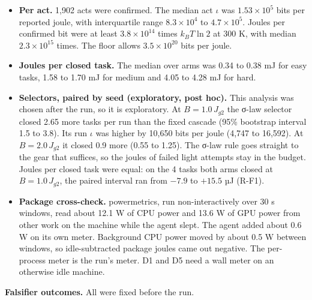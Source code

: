 \documentclass[
  10pt,
]{article}
\providecommand{\tightlist}{%
  \setlength{\itemsep}{0pt}\setlength{\parskip}{0pt}}
\begin{document}
\begin{itemize}
\tightlist
\item
  \textbf{Per act.} 1,902 acts were confirmed. The median act \(\iota\)
  was \(1.53 \times 10^5\) bits per reported joule, with interquartile
  range \(8.3 \times 10^4\) to \(4.7 \times 10^5\). Joules per confirmed
  bit were at least \(3.8 \times 10^{14}\) times \(k_B T\ln 2\) at 300
  K, with median \(2.3 \times 10^{15}\) times. The floor allows
  \(3.5 \times 10^{20}\) bits per joule.
\item
  \textbf{Joules per closed task.} The median over arms was 0.34 to 0.38
  mJ for easy tasks, 1.58 to 1.70 mJ for medium and 4.05 to 4.28 mJ for
  hard.
\item
  \textbf{Selectors, paired by seed (exploratory, post hoc).} This
  analysis was chosen after the run, so it is exploratory. At
  \(B = 1.0\,J_{g2}\) the σ-law selector closed 2.65 more tasks per run
  than the fixed cascade (95\% bootstrap interval 1.5 to 3.8). Its run
  \(\iota\) was higher by 10,650 bits per joule (4,747 to 16,592). At
  \(B = 2.0\,J_{g2}\) it closed 0.9 more (0.55 to 1.25). The σ-law rule
  goes straight to the gear that suffices, so the joules of failed light
  attempts stay in the budget. Joules per closed task were equal: on the
  4 tasks both arms closed at \(B = 1.0\,J_{g2}\), the paired interval
  ran from \(-7.9\) to \(+15.5\) µJ (R-F1).
\item
  \textbf{Package cross-check.} powermetrics, run non-interactively over
  30 s windows, read about 12.1 W of CPU power and 13.6 W of GPU power
  from other work on the machine while the agent slept. The agent added
  about 0.6 W on its own meter. Background CPU power moved by about 0.5
  W between windows, so idle-subtracted package joules came out
  negative. The per-process meter is the run's meter. D1 and D5 need a
  wall meter on an otherwise idle machine.
\end{itemize}

\textbf{Falsifier outcomes.} All were fixed before the run.
\end{document}
